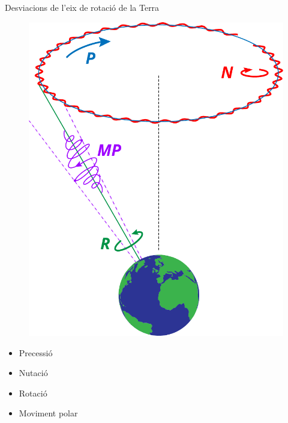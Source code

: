 \documentclass{beamer} %
\begin{document}
\begin{frame}{Desviacions de l'eix de rotació de la Terra}
  \begin{minipage}{0.49\textwidth}
    \begin{figure}
      \centering
      \includegraphics[width=\textwidth]{../Images/precession_nutation_ca.pdf}
    \end{figure}
  \end{minipage}
  \begin{minipage}{0.49\textwidth}
    \begin{itemize}
      \item \textcolor[RGB]{0,113,188}{{Precessió}}
      \item \textcolor[RGB]{255,0,0}{{Nutació}}
      \item \textcolor[RGB]{0,146,70}{{Rotació}}
      \item \textcolor[RGB]{158,0,255}{{Moviment polar}}
    \end{itemize}
    \vspace{1cm}
    \begin{figure}
      \centering

\end{figure}
\end{minipage}
\end{frame}
\end{document}
